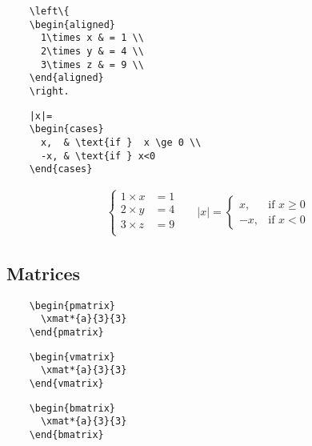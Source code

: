 \begin{multicols}{2}
  \begin{verbatim}
    \left\{
    \begin{aligned}
      1\times x & = 1 \\
      2\times y & = 4 \\
      3\times z & = 9 \\
    \end{aligned}
    \right.
  \end{verbatim}
  \newcolumn
  \begin{verbatim}
    |x|=
    \begin{cases}
      x,  & \text{if }  x \ge 0 \\
      -x, & \text{if } x<0
    \end{cases}
  \end{verbatim}
\end{multicols}

\begin{mdframed}[style=example]
  \begin{align*}
    \left\{
    \begin{aligned}
      1\times x & = 1 \\
      2\times y & = 4 \\
      3\times z & = 9 \\
    \end{aligned}
    \right.
     &  &
    |x|=
    \begin{cases}
      x,  & \text{if }  x \ge 0 \\
      -x, & \text{if } x<0
    \end{cases}
  \end{align*}
\end{mdframed}

\subsection{Matrices}
\begin{multicols}{3}
  \begin{verbatim}
    \begin{pmatrix}
      \xmat*{a}{3}{3}
    \end{pmatrix}
  \end{verbatim}
  \columnbreak
  \begin{verbatim}
    \begin{vmatrix}
      \xmat*{a}{3}{3}
    \end{vmatrix}
  \end{verbatim}
  \columnbreak
  \begin{verbatim}
    \begin{bmatrix}
      \xmat*{a}{3}{3}
    \end{bmatrix}
  \end{verbatim}
\end{multicols}

